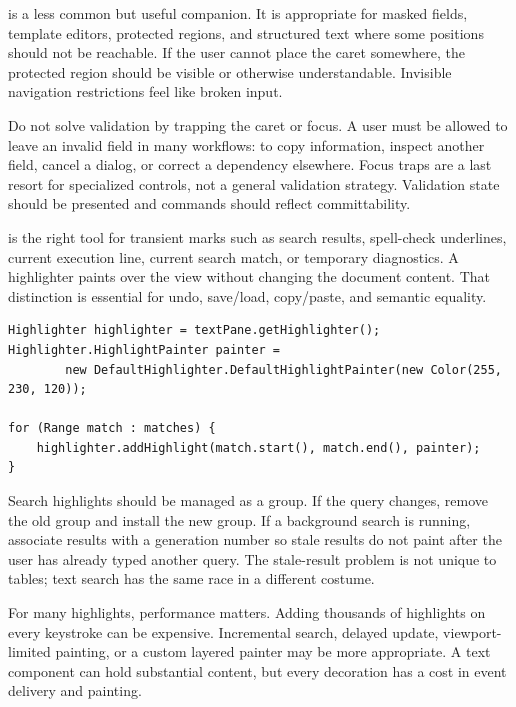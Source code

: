  is a less common but useful companion. It is appropriate for masked fields, template editors, protected regions, and structured text where some positions should not be reachable. If the user cannot place the caret somewhere, the protected region should be visible or otherwise understandable. Invisible navigation restrictions feel like broken input.

Do not solve validation by trapping the caret or focus. A user must be allowed to leave an invalid field in many workflows: to copy information, inspect another field, cancel a dialog, or correct a dependency elsewhere. Focus traps are a last resort for specialized controls, not a general validation strategy. Validation state should be presented and commands should reflect committability.

 is the right tool for transient marks such as search results, spell-check underlines, current execution line, current search match, or temporary diagnostics. A highlighter paints over the view without changing the document content. That distinction is essential for undo, save/load, copy/paste, and semantic equality.

\begin{lstlisting}[caption={Adding search highlights without modifying the document.}]
Highlighter highlighter = textPane.getHighlighter();
Highlighter.HighlightPainter painter =
        new DefaultHighlighter.DefaultHighlightPainter(new Color(255, 230, 120));

for (Range match : matches) {
    highlighter.addHighlight(match.start(), match.end(), painter);
}
\end{lstlisting}

Search highlights should be managed as a group. If the query changes, remove the old group and install the new group. If a background search is running, associate results with a generation number so stale results do not paint after the user has already typed another query. The stale-result problem is not unique to tables; text search has the same race in a different costume.

For many highlights, performance matters. Adding thousands of highlights on every keystroke can be expensive. Incremental search, delayed update, viewport-limited painting, or a custom layered painter may be more appropriate. A text component can hold substantial content, but every decoration has a cost in event delivery and painting.

